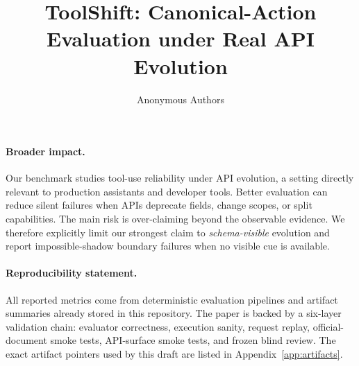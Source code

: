 \documentclass{article}
\title{ToolShift: Canonical-Action Evaluation under Real API Evolution}
\author{Anonymous Authors}
\begin{document}
\maketitle

\begin{abstract}

\end{abstract}










\paragraph{Broader impact.}
Our benchmark studies tool-use reliability under API evolution, a setting directly relevant to production assistants and developer tools. Better evaluation can reduce silent failures when APIs deprecate fields, change scopes, or split capabilities. The main risk is over-claiming beyond the observable evidence. We therefore explicitly limit our strongest claim to \emph{schema-visible} evolution and report impossible-shadow boundary failures when no visible cue is available.

\paragraph{Reproducibility statement.}
All reported metrics come from deterministic evaluation pipelines and artifact summaries already stored in this repository. The paper is backed by a six-layer validation chain: evaluator correctness, execution sanity, request replay, official-document smoke tests, API-surface smoke tests, and frozen blind review. The exact artifact pointers used by this draft are listed in Appendix~\ref{app:artifacts}.




\appendix

\end{document}
